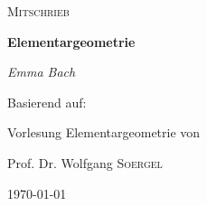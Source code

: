 \begin{titlepage}
	\centering
	{\Large \textsc{Mitschrieb}\par}
	\vspace{0.5cm}
	{\huge\bfseries Elementargeometrie\par}
    \vspace{0.5cm}
	{\Large\itshape Emma Bach\par}
	\vfill
	
	Basierend auf:\par 
	\vspace{1cm}
	Vorlesung Elementargeometrie von\par
	Prof. Dr. Wolfgang  \textsc{Soergel}\par
	
	\vfill

	{\large \today\par}
\end{titlepage}
